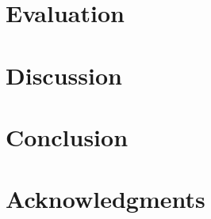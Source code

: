 \documentclass[11pt,a4paper]{article}
\begin{document}
\section{Evaluation}

\section{Discussion}

\section{Conclusion}

\section*{Acknowledgments}



\end{document}
